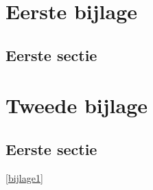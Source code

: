 \begin{appendix}

\chapter{Eerste bijlage}
\label{bijlage1}

\blindtext

\section{Eerste sectie}

\blindtext

\chapter{Tweede bijlage}
\label{bijlage2}

\blindtext

\section{Eerste sectie}

\blindtext
\autoref{bijlage1}

\end{appendix}